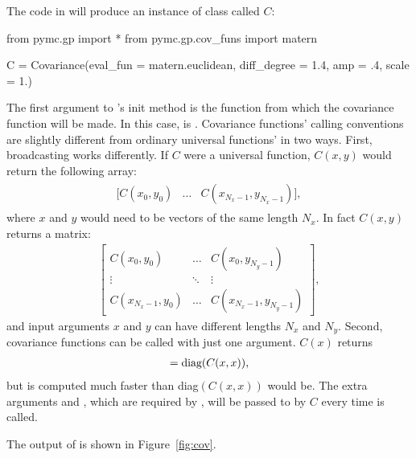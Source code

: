 \documentclass[article]{jss}
\begin{document}
The code in  will produce an instance of class  called $C$:
\begin{CodeChunk}
\begin{CodeInput}
from pymc.gp import *
from pymc.gp.cov_funs import matern

C = Covariance(eval_fun = matern.euclidean, diff_degree = 1.4, amp = .4, scale = 1.)
\end{CodeInput}
\end{CodeChunk}

The first argument to 's init method is the  function from which the covariance function will be made. In this case,  is . Covariance functions' calling conventions are slightly different from ordinary  universal functions' \citep{numpybook} in two ways. First, broadcasting works differently. If $C$ were a  universal function, $C(x,y)$ would return the following array:
    \begin{eqnarray*}
        \begin{array}{ccc}
            [C(x_0,y_0)& \ldots& C(x_{N_x-1},y_{N_x-1})],
        \end{array}
    \end{eqnarray*}
    where $x$ and $y$ would need to be vectors of the same length $N_x$. In fact $C(x,y)$ returns a matrix:
    \begin{eqnarray*}
        \left[\begin{array}{ccc}
            C(x_0,y_0)& \ldots& C(x_0,y_{N_y-1})\\
            \vdots&\ddots&\vdots\\
            C(x_{N_x-1},y_0)& \ldots& C(x_{N_x-1},y_{N_y-1})
        \end{array}\right],
    \end{eqnarray*}
    and input arguments $x$ and $y$ can have different lengths $N_x$ and $N_y$. Second, covariance functions can be called with just one argument. $C(x)$ returns
    \begin{eqnarray*}
         [C(x_0,x_0)& \ldots& C(x_{N_x-1},x_{N_x-1})] = \textup{diag}(C(x,x)),
    \end{eqnarray*}
    but is computed much faster than diag$(C(x,x))$ would be.
The extra arguments  and , which are required by , will be passed to  by $C$ every time is called.
 
The output of  is shown in Figure~\ref{fig:cov}.
\end{document}

